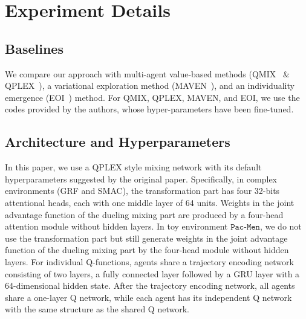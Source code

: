 

\section{Experiment Details}

\subsection{Baselines}\label{Baselines}

We compare our approach with multi-agent value-based methods (QMIX~\cite{rashid2018qmix} \& QPLEX~\cite{wang2020qplex}), a variational exploration method (MAVEN~\cite{mahajan2019maven}), and an individuality emergence (EOI~\cite{jiang2020emergence}) method. For QMIX, QPLEX, MAVEN, and EOI, we use the codes provided by the authors, whose hyper-parameters have been fine-tuned.

\subsection{Architecture and Hyperparameters}\label{sec:hyper}

In this paper, we use a QPLEX style mixing network with its default hyperparameters suggested by the original paper. Specifically, in complex environments (GRF and SMAC), the transformation part has four 32-bits attentional heads, each with one middle layer of 64 units. Weights in the joint advantage function of the dueling mixing part are produced by a four-head attention module without hidden layers. In toy environment $\mathtt{Pac}$-$\mathtt{Men}$, we do not use the transformation part but still generate weights in the joint advantage function of the dueling mixing part by the four-head module without hidden layers. For individual Q-functions, agents share a trajectory encoding network consisting of two layers, a fully connected layer followed by a GRU layer with a 64-dimensional hidden state. After the trajectory encoding network, all agents share a one-layer Q network, while each agent has its independent Q network with the same structure as the shared Q network. 

